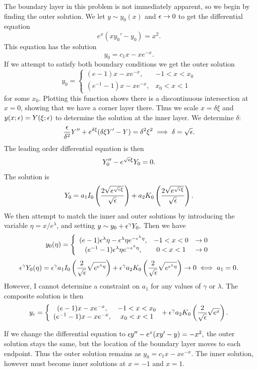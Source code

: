 The boundary layer in this problem is not immediately apparent, so we begin by finding the outer solution. We let $y\sim y_0(x)$ and $\epsilon\to 0$ to get the differential equation
$$e^x(xy_0'-y_0)=x^2.$$
This equation has the solution
$$y_0=c_1 x-xe^{-x}.$$
If we attempt to satisfy both boundary conditions we get the outer solution
$$y_0=\left\{\begin{array}{cc}(e-1)x-xe^{-x},&-1<x<x_0\\(e^{-1}-1)x-xe^{-x},&x_0<x<1\end{array}\right.$$
for some $x_0.$ Plotting this function shows there is a discontinuous intersection at $x=0$, showing that we have a corner layer there.
Thus we scale $x=\delta\xi$ and $y(x;\epsilon)=Y(\xi;\epsilon)$ to determine the solution at the inner layer. We determine $\delta$:
$$\frac{\epsilon}{\delta^2}Y''+e^{\delta\xi}(\delta\xi Y'-Y)=\delta^2\xi^2\implies \delta=\sqrt{\epsilon}.$$
The leading order differential equation is then
$$Y_0''-e^{\sqrt{\epsilon}\xi}Y_0=0.$$
The solution is
$$Y_0=a_1 I_0\left(\frac{2\sqrt{e^{\sqrt{\epsilon}\xi}}}{\sqrt{\epsilon}}\right)+a_2K_0\left(\frac{2\sqrt{e^{\sqrt{\epsilon}\xi}}}{\sqrt{\epsilon}}\right).$$
We then attempt to match the inner and outer solutions by introducing the variable $\eta=x/e^\lambda$, and setting $y\sim y_0+\epsilon^\gamma Y_0.$ Then we have
$$y_0(\eta)=\left\{\begin{array}{ccc}(e-1)\epsilon^\lambda \eta-\epsilon^\lambda \eta e^{-\epsilon^\lambda\eta}, &-1<x<0 &\to 0\\(e^{-1}-1)\epsilon^\lambda\eta e^{-\epsilon^\lambda\eta},&0<x<1&\to 0\end{array}\right.$$
$$\epsilon^\gamma Y_0(\eta)=\epsilon^\gamma a_1 I_0\left(\frac{2}{\sqrt{\epsilon}}\sqrt{e^{\epsilon^\lambda \eta}}\right)+\epsilon^\gamma a_2 K_0\left(\frac{2}{\sqrt{\epsilon}}\sqrt{e^{\epsilon^\lambda \eta}}\right)\to 0 \iff a_1=0.$$
However, I cannot determine a constraint on $a_1$ for any values of $\gamma$ or $\lambda.$ The composite solution is then
$$y_c=\left\{\begin{array}{cc}(e-1)x-xe^{-x},&-1<x<x_0\\(e^{-1}-1)x-xe^{-x},&x_0<x<1\end{array}\right.+\epsilon^\gamma a_2 K_0\left(\frac{2}{\sqrt{\epsilon}}\sqrt{e^{x}}\right).$$

If we change the differential equation to $\epsilon y''-e^x(xy'-y)=-x^2,$ the outer solution stays the same, but the location of the boundary layer moves to each endpoint. Thus the outer solution remains as $y_0=c_1x-xe^{-x}$. The inner solution, however must become inner solutions at $x=-1$ and $x=1.$



